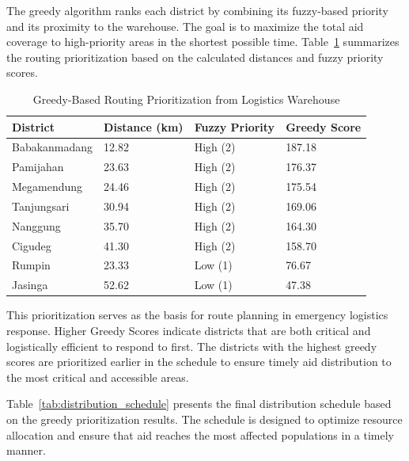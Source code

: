 \documentclass[journal,final,a4paper,twoside,11pt]{IEEEtran}
\begin{document}
The greedy algorithm ranks each district by combining its fuzzy-based priority and its proximity to the warehouse. The goal is to maximize the total aid coverage to high-priority areas in the shortest possible time. Table~\ref{tab:greedy_routing} summarizes the routing prioritization based on the calculated distances and fuzzy priority scores. 


\begin{table}[H]
\caption{Greedy-Based Routing Prioritization from Logistics Warehouse}
\begin{center}
\begin{tabular}{|l|p{1cm}|p{2cm}|p{1cm}|}
\hline
\textbf{District} & \textbf{Distance (km)} & \textbf{Fuzzy Priority} & \textbf{Greedy Score} \\
\hline
Babakanmadang & 12.82 & High (2) & 187.18 \\
Pamijahan & 23.63 & High (2) & 176.37 \\
Megamendung & 24.46 & High (2) & 175.54 \\
Tanjungsari & 30.94 & High (2) & 169.06 \\
Nanggung & 35.70 & High (2) & 164.30 \\
Cigudeg & 41.30 & High (2) & 158.70 \\
Rumpin & 23.33 & Low (1) & 76.67 \\
Jasinga & 52.62 & Low (1) & 47.38 \\
\hline
\end{tabular}
\label{tab:greedy_routing}
\end{center}
\end{table}


This prioritization serves as the basis for route planning in emergency logistics response. Higher Greedy Scores indicate districts that are both critical and logistically efficient to respond to first. The districts with the highest greedy scores are prioritized earlier in the schedule to ensure timely aid distribution to the most critical and accessible areas.

Table~\ref{tab:distribution_schedule} presents the final distribution schedule based on the greedy prioritization results. The schedule is designed to optimize resource allocation and ensure that aid reaches the most affected populations in a timely manner.
\end{document}
